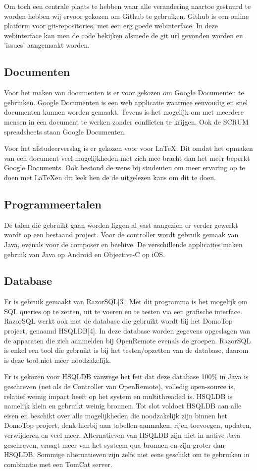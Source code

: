 \documentclass[]{article}
\begin{document}
Om toch een centrale plaats te hebben waar alle verandering naartoe
gestuurd te worden hebben wij ervoor gekozen om Github te gebruiken. Github
is een online platform voor git-repositories, met een erg goede
webinterface. In deze webinterface kan men de code bekijken alsmede de git url
gevonden worden en 'issues' aangemaakt worden.

\subsection{Documenten}
Voor het maken van documenten is er voor gekozen om Google Documenten te
gebruiken. Google Documenten is een web applicatie waarmee eenvoudig en
snel documenten kunnen worden gemaakt. Tevens is het mogelijk om met
meerdere mensen in een document te werken zonder conflicten te krijgen. Ook
de SCRUM spreadsheets staan Google Documenten.

Voor het afstudeerverslag is er gekozen voor voor \LaTeX. Dit omdat het opmaken
van een document veel mogelijkheden met zich mee bracht dan het meer
beperkt Google Documents. Ook bestond de wens bij studenten
om meer ervaring op te doen met \LaTeX\space en dit leek hen de de uitgelezen kans om
dit te doen.

\subsection{Programmeertalen}
De talen die gebruikt gaan worden liggen al vast aangezien er verder 
gewerkt wordt op een bestaand project. Voor de controller wordt gebruik gemaak van
Java, evenals voor de composer en beehive. De verschillende applicaties maken gebruik
van Java op Android en Objective-C op iOS.

\subsection{Database}
Er is gebruik gemaakt van RazorSQL[3]. Met dit programma is het mogelijk om
SQL queries op te zetten, uit te voeren en te testen via een grafische
interface. RazorSQL werkt ook met de database die gebruikt wordt bij het DomoTop project,
genaamd HSQLDB[4]. In deze database worden gegevens opgeslagen van de
apparaten die zich aanmelden bij OpenRemote evenals de groepen.
RazorSQL is enkel een tool die gebruikt is bij het
testen/opzetten van de database, daarom is deze tool niet meer
noodzakelijk.

Er is gekozen voor HSQLDB vanwege het feit dat deze database 100\% in Java
is geschreven (net als de Controller van OpenRemote), volledig open-source is,
relatief weinig impact heeft op het system en multithreaded is.
HSQLDB is namelijk klein en gebruikt weinig bronnen. Tot slot voldoet
HSQLDB aan alle eisen en beschikt over alle mogelijkheden die noodzakelijk
zijn binnen het DomoTop project, denk hierbij aan tabellen aanmaken, rijen
toevoegen, updaten, verwijderen en veel meer. Alternatieven van HSQLDB zijn
niet in native Java geschreven,  vraagt meer van het systeem qua
bronnen en zijn groter dan HSQLDB. Sommige alternatieven zijn zelfs niet
eens geschikt om te gebruiken in combinatie met een TomCat server.
\end{document}
